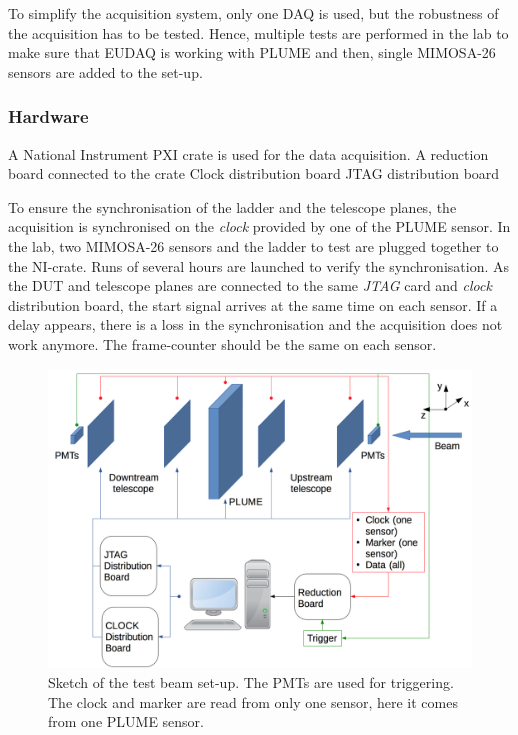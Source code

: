       To simplify the acquisition system, only one DAQ is used, but the robustness of the acquisition has to be tested. 
      Hence, multiple tests are performed in the lab to make sure that EUDAQ is working with \gls{PLUME} and then, single MIMOSA-26 sensors are added to the set-up.

      \subsubsection{Hardware}

      A National Instrument PXI crate is used for the data acquisition. 
      A reduction board connected to the crate
      Clock distribution board
      JTAG distribution board

      To ensure the synchronisation of the ladder and the telescope planes, the acquisition is synchronised on the \textit{clock} provided by one of the \gls{PLUME} sensor.
      In the lab, two MIMOSA-26 sensors and the ladder to test are plugged together to the NI-crate. 
      Runs of several hours are launched to verify the synchronisation.
      As the \gls{DUT} and telescope planes are connected to the same \textit{JTAG} card and \textit{clock} distribution board, the start signal arrives at the same time on each sensor.
      If a delay appears, there is a loss in the synchronisation and the acquisition does not work anymore.
      The frame-counter should be the same on each sensor.

    \begin{figure}
      \centering
      \includegraphics[width = \textwidth]{Pictures/X0/testBeamAcquisition.png}
      \caption{Sketch of the test beam set-up. The PMTs are used for triggering. The clock and marker are read from only one sensor, here it comes from one PLUME sensor.}
      \label{fig:testBeamAcq}
    \end{figure}

